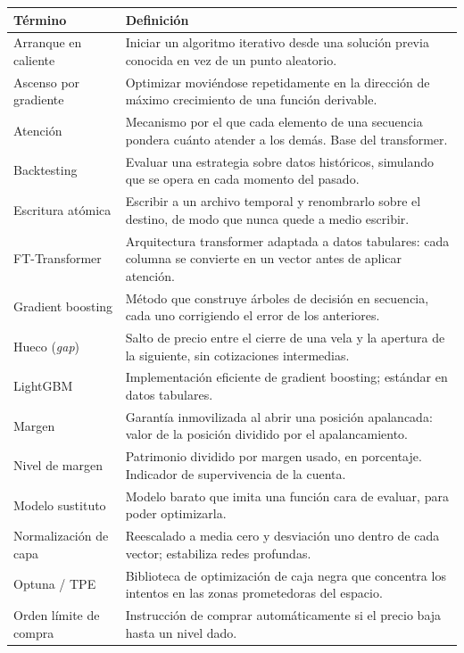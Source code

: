 \documentclass[11pt,a4paper]{article}
\begin{document}
\begin{longtable}{@{}p{4.3cm} p{\dimexpr\linewidth-4.8cm\relax}@{}}
\toprule
\textbf{Término} & \textbf{Definición} \\
\midrule
\endhead
Arranque en caliente & Iniciar un algoritmo iterativo desde una solución previa conocida en vez de un punto aleatorio. \\
Ascenso por gradiente & Optimizar moviéndose repetidamente en la dirección de máximo crecimiento de una función derivable. \\
Atención & Mecanismo por el que cada elemento de una secuencia pondera cuánto atender a los demás. Base del transformer. \\
Backtesting & Evaluar una estrategia sobre datos históricos, simulando que se opera en cada momento del pasado. \\
Escritura atómica & Escribir a un archivo temporal y renombrarlo sobre el destino, de modo que nunca quede a medio escribir. \\
FT-Transformer & Arquitectura transformer adaptada a datos tabulares: cada columna se convierte en un vector antes de aplicar atención. \\
Gradient boosting & Método que construye árboles de decisión en secuencia, cada uno corrigiendo el error de los anteriores. \\
Hueco (\textit{gap}) & Salto de precio entre el cierre de una vela y la apertura de la siguiente, sin cotizaciones intermedias. \\
LightGBM & Implementación eficiente de gradient boosting; estándar en datos tabulares. \\
Margen & Garantía inmovilizada al abrir una posición apalancada: valor de la posición dividido por el apalancamiento. \\
Nivel de margen & Patrimonio dividido por margen usado, en porcentaje. Indicador de supervivencia de la cuenta. \\
Modelo sustituto & Modelo barato que imita una función cara de evaluar, para poder optimizarla. \\
Normalización de capa & Reescalado a media cero y desviación uno dentro de cada vector; estabiliza redes profundas. \\
Optuna / TPE & Biblioteca de optimización de caja negra que concentra los intentos en las zonas prometedoras del espacio. \\
Orden límite de compra & Instrucción de comprar automáticamente si el precio baja hasta un nivel dado. \\

\end{longtable}
\end{document}
